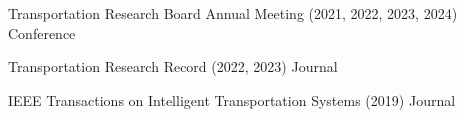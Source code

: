 

\begin{cvservices}

  \cvservice
    {Transportation Research Board Annual Meeting} %
    {(2021, 2022, 2023, 2024)} %
    {} %
    {Conference} %

  \cvservice
    {Transportation Research Record} %
    {(2022, 2023)} %
    {} %
    {Journal} %

  \cvservice
    {IEEE Transactions on Intelligent Transportation Systems} %
    {(2019)} %
    {} %
    {Journal} %

\end{cvservices}

